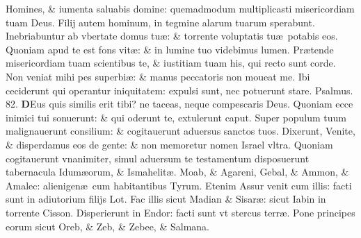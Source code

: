 \documentclass[a5paper,10pt]{book}
\def\ae{æ}
\begin{document}
\begin{multicols*}{2}
\newline \color{red} H\color{black}omines, \& iumenta saluabis domine: quemadmodum multiplicasti misericordiam tuam Deus.
\newline \color{red} F\color{black}ilij autem hominum, in tegmine alarum tuarum sperabunt.
\newline \color{red} I\color{black}nebriabuntur ab vbertate domus tu\ae : \& torrente voluptatis tu\ae \ potabis eos.
\newline \color{red} Q\color{black}uoniam apud te est fons vit\ae : \& in lumine tuo videbimus lumen.
\newline \color{red} P\color{black}r\ae tende misericordiam tuam scientibus te, \& iustitiam tuam his, qui recto sunt corde.
\newline \color{red} N\color{black}on veniat mihi pes superbi\ae : \& manus peccatoris non moueat me.
\newline \color{red} I\color{black}bi ceciderunt qui operantur iniquitatem: expulsi sunt, nec potuerunt stare. \quad \color{red} Psalmus. \hypertarget{ps82}{82.} \color{black}
\vspace{-1em}
\lettrine[lines=2]{\bfseries \color{red} D}{}Eus quis similis erit tibi? ne taceas, neque compescaris Deus.
\newline \color{red} Q\color{black}uoniam ecce inimici tui sonuerunt: \& qui oderunt te, extulerunt caput.
\newline \color{red} S\color{black}uper populum tuum malignauerunt consilium: \& cogitauerunt aduersus sanctos tuos.
\newline \color{red} D\color{black}ixerunt, Venite, \& disperdamus eos de gente: \& non memoretur nomen Israel vltra.
\newline \color{red} Q\color{black}uoniam cogitauerunt vnanimiter, simul aduersum te testamentum disposuerunt tabernacula Idum\ae orum, \& Ismahelit\ae .
\newline \color{red} M\color{black}oab, \& Agareni, Gebal, \& Ammon, \& Amalec: alienigen\ae \ cum habitantibus Tyrum.
\newline \color{red} E\color{black}tenim Assur venit cum illis: facti sunt in adiutorium filijs Lot.
\newline \color{red} F\color{black}ac illis sicut Madian \& Sisar\ae : sicut Iabin in torrente Cisson.
\newline \color{red} D\color{black}isperierunt in Endor: facti sunt vt stercus terr\ae .
\newline \color{red} P\color{black}one principes eorum sicut Oreb, \& Zeb, \& Zebee, \& Salmana.

\end{multicols*}
\end{document}
